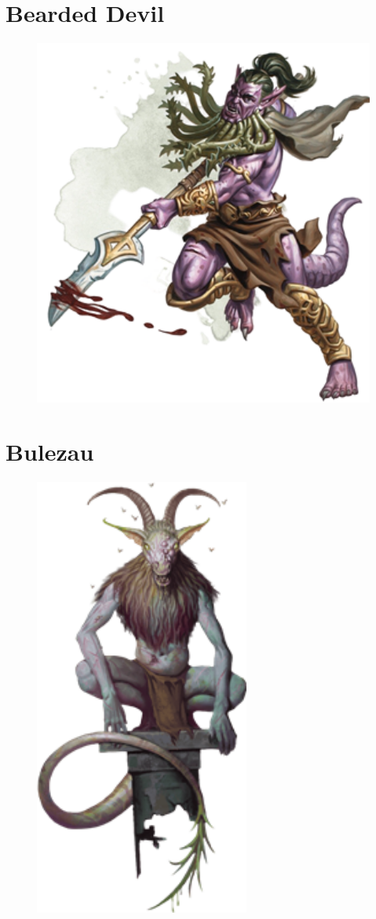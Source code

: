 \documentclass[oneside]{clgrammar}
\begin{document}
\section{Bearded Devil}
\begin{figure}[h!]
\centering
\includegraphics[width=350pt]{images/monstros/bearded_devil-removebg-preview.png}
\end{figure}

\newpage

\section{Bulezau}
\begin{figure}[h!]
\centering
\includegraphics[width=200pt]{images/monstros/bulezau.png}
\end{figure}
\end{document}
